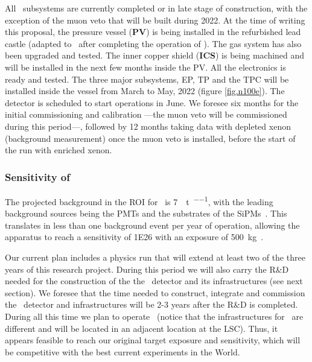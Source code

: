 All \Next\ subsystems are currently completed or in late stage of construction, with the exception of the muon veto that will be built during 2022. At the time of writing this proposal, the pressure vessel ({\bf PV}) is being installed in the refurbished lead castle (adapted to \Next\ after completing the operation of \NEW). The gas system has also been upgraded and tested. The inner copper shield  ({\bf ICS}) is being machined and will be installed in the next few months inside the PV. All the electronics is ready and tested. The three major subsystems, EP, TP and the TPC will be installed inside the vessel from March to May, 2022 (figure \ref{fig.n100e}). The detector is scheduled to start operations in June. We foresee six months for the initial commissioning and calibration ---the muon veto will be commissioned during this period---, followed by 12 months taking data with depleted xenon (background measurement) once the muon veto is installed, before the start of the run with enriched xenon. 


\subsubsection{Sensitivity of \Next}

The projected background in the ROI for \Next\ is \SI{7}{\ev\per\tonne\per\yr}, with the leading background sources being the PMTs and the substrates of the SiPMs~\cite{Martin-Albo:2015rhw}.  This translates in less than one background event per year of operation, allowing the apparatus to reach 
a sensitivity of \SI{1E26}{\yr} with an exposure of \SI{500}{\kg\yr}. 


Our current plan includes a physics run that will extend at least two of the three years of this research project. During this period we will also carry the R\&D needed for the construction of the the \NHD\ detector and its infrastructures (see next section). We foresee that the time needed to construct, integrate and commission the \NHD\ detector and infrastructures will be 2-3 years after the R\&D is completed. During all this time we plan to operate \Next\ (notice that the infrastructures for \NHD\ are different and will be located in an adjacent location at the LSC). Thus, it appears feasible to reach our original target exposure and sensitivity, which will be competitive with the best current experiments in the World. 

